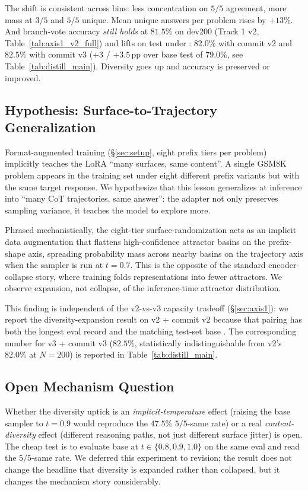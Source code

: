 The shift is consistent across bins: less concentration on $5/5$
agreement, more mass at $3/5$ and $5/5$ unique.  Mean unique
answers per problem rises by $+13\%$.  And branch-vote accuracy
\emph{still holds} at $81.5\%$ on dev200 (Track 1 v2,
Table~\ref{tab:axis1_v2_full}) and lifts on test under \cmajc{}:
$82.0\%$ with commit v2 and $82.5\%$ with commit v3 ($+3$ /
$+3.5$\,pp over base test \cmaj{} of $79.0\%$, see
Table~\ref{tab:distill_main}).  Diversity goes up and accuracy is
preserved or improved.

\subsection{Hypothesis: Surface-to-Trajectory Generalization}
\label{subsec:axis3_hypothesis}

Format-augmented training (\S\ref{sec:setup}, eight prefix tiers
per problem) implicitly teaches the LoRA ``many surfaces, same
content''.  A single GSM8K problem appears in the training set
under eight different prefix variants but with the same target
response.  We hypothesize that this lesson generalizes at
inference into ``many CoT trajectories, same answer'': the
adapter not only preserves sampling variance, it teaches the
model to explore more.

Phrased mechanistically, the eight-tier surface-randomization
acts as an implicit data augmentation that flattens
high-confidence attractor basins on the prefix-shape axis,
spreading probability mass across nearby basins on the
trajectory axis when the sampler is run at $t{=}0.7$.  This is the
opposite of the standard encoder-collapse story, where training
folds representations into fewer attractors.  We observe expansion,
not collapse, of the inference-time attractor distribution.

This finding is independent of the v2-vs-v3 capacity tradeoff
(\S\ref{sec:axis1}): we report the diversity-expansion result on
v2 + commit v2 because that pairing has both the longest eval
record and the matching test-set base \cmaj{}.  The corresponding
\cmajc{} number for v3 + commit v3 ($82.5\%$, statistically
indistinguishable from v2's $82.0\%$ at $N{=}200$) is reported in
Table~\ref{tab:distill_main}.

\subsection{Open Mechanism Question}
\label{subsec:axis3_open}

Whether the diversity uptick is an \emph{implicit-temperature}
effect (raising the base sampler to $t{=}0.9$ would reproduce the
$47.5\%$ $5/5$-same rate) or a real \emph{content-diversity}
effect (different reasoning paths, not just different surface
jitter) is open.  The cheap test is to evaluate base \LLaDA{} at
$t \in \{0.8, 0.9, 1.0\}$ on the same eval and read the
$5/5$-same rate.  We deferred this experiment to revision; the
result does not change the headline that diversity is expanded
rather than collapsed, but it changes the mechanism story
considerably.

